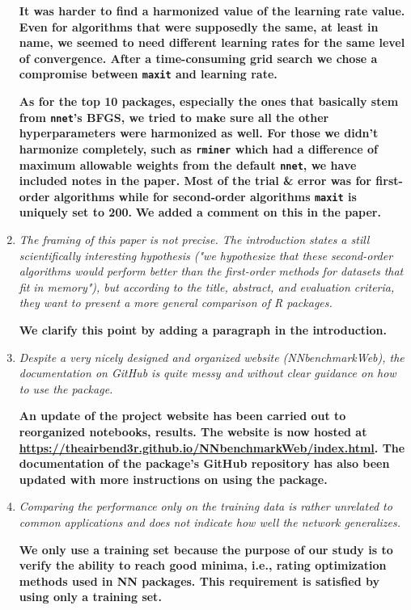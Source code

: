 \documentclass[12pt]{article}
\newcommand{\code}{\texttt}
\begin{document}
\begin{enumerate}
\textbf{It was harder to find a harmonized value of the learning rate value. 
Even for algorithms that were supposedly the same, at least in name, we seemed to need
different learning rates for the same level of convergence. 
After a time-consuming grid search we chose a compromise between \code{maxit} and learning rate.}

\textbf{As for the top 10 packages, especially the ones that basically stem from \code{nnet}'s BFGS, we tried to make sure all the other hyperparameters 
were harmonized as well. 
For those we didn't harmonize completely, such as \code{rminer} which had a difference of
maximum allowable weights from the default \code{nnet}, 
we have included notes in the paper. 
Most of the trial \& error was for first-order algorithms while for second-order algorithms \code{maxit} is uniquely set to 200. }
\textbf{We added a comment on this in the paper.}


\item \textit{The framing of this paper is not precise. The introduction states a still scientifically interesting hypothesis ("we hypothesize that these second-order algorithms would perform better than the first-order methods for datasets that fit in memory"), but according to the title, abstract, and evaluation criteria, they want to present a more general comparison of R packages.}

\textbf{We clarify this point by adding a paragraph in the introduction.}



\item \textit{Despite a very nicely designed and organized website (NNbenchmarkWeb), the documentation on GitHub is quite messy and without clear guidance on how to use the package.}

\textbf{An update of the project website has been carried out to reorganized notebooks, results.
The website is now hosted at \url{https://theairbend3r.github.io/NNbenchmarkWeb/index.html}.
The documentation of the package's GitHub repository has also been updated with more instructions on using the package.}



\item \textit{Comparing the performance only on the training data is rather unrelated to common applications and does not indicate how well the network generalizes.}

\textbf{We only use a training set because the purpose of our study is to verify the ability to reach good minima, i.e., rating optimization
methods used in NN packages. This requirement is satisfied by using only a training set.}


\end{enumerate}
\end{document}
